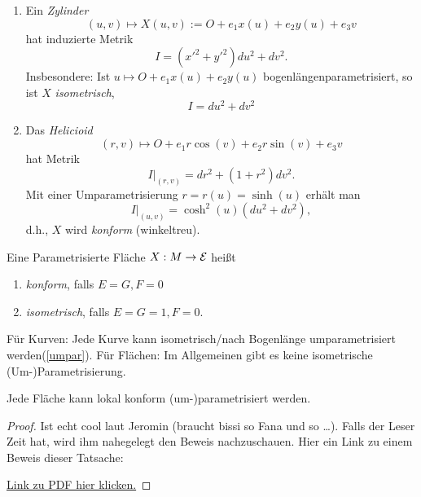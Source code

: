 \begin{example}
	
	\begin{enumerate}
		
		\item Ein \emph{Zylinder}
			\[ (u,v) \mapsto X(u,v) := O + e_1x(u) + e_2y(u) +e_3v \]
		hat induzierte Metrik \[ I = (x'^2 + y'^2)du^2 + dv^2. \]
		Insbesondere: Ist $ u \mapsto O+e_1x(u) + e_2y(u) $ bogenlängenparametrisiert, so ist $ X $ \emph{isometrisch},
		\[I = du^2 + dv^2\]
		
		\item Das \emph{Helicioid} \[ (r,v) \mapsto O + e_1r\cos(v)+e_2r\sin(v) + e_3v \]
		hat Metrik \[ I\big|_{(r,v)}=dr^2 + (1+r^2)dv^2. \]
		Mit einer Umparametrisierung $r = r(u) = \sinh(u)$ erhält man \[ I \big|_{(u,v)}= \cosh^2(u)(du^2+dv^2), \] d.h., $X$ wird \emph{konform} (winkeltreu).
		
	\end{enumerate}
	
\end{example}

\begin{definition}
	
	Eine Parametrisierte Fläche $ X : M \rightarrow \mathcal E $ heißt 
	\begin{enumerate}
		\item \emph{konform}, falls $ E = G, F = 0 $
		\item \emph{isometrisch}, falls $ E = G = 1, F= 0 $.
	\end{enumerate}
	
\end{definition}


\begin{remark}
	
	Für Kurven: Jede Kurve kann isometrisch/nach Bogenlänge umparametrisiert werden(\ref*{umpar}).  Für Flächen: Im Allgemeinen gibt es keine isometrische (Um-)Parametrisierung.
	
\end{remark}

\begin{theorem}
	
	Jede Fläche kann lokal konform (um-)parametrisiert werden. 
	
\end{theorem}

\begin{proof}
	
	Ist echt cool laut Jeromin (braucht bissi so Fana und so \ldots).
	Falls der Leser Zeit hat, wird ihm nahegelegt den Beweis nachzuschauen.
	Hier ein Link zu einem Beweis dieser Tatsache:

 	\href{https://thibaultlefeuvre.files.wordpress.com/2017/02/coord_isotherm.pdf}{Link zu PDF hier klicken.}
 	
	\end{proof}

